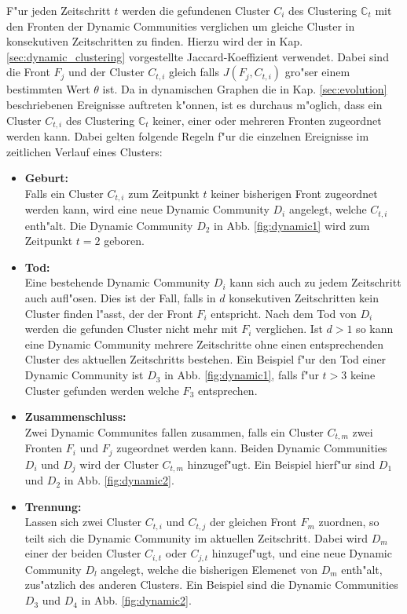 \documentclass[journal]{vgtc}
\begin{document}
    F"ur jeden Zeitschritt $t$ werden die gefundenen Cluster $C_i$ des Clustering $\mathbb{C}_t$ mit den Fronten der Dynamic Communities
    verglichen um gleiche Cluster in konsekutiven Zeitschritten zu finden. Hierzu wird der in Kap. \ref{sec:dynamic_clustering}
    vorgestellte Jaccard-Koeffizient verwendet. Dabei sind die
    Front $F_j$ und der Cluster $C_{t,i}$ gleich falls $J(F_j,C_{t,i})$ gro"ser einem bestimmten Wert $\theta$ ist. Da in dynamischen Graphen
    die in Kap. \ref{sec:evolution} beschriebenen Ereignisse auftreten k"onnen, ist es durchaus m"oglich, dass ein Cluster $C_{t,i}$ des
    Clustering $\mathbb{C}_t$ keiner, einer oder mehreren Fronten zugeordnet werden kann. Dabei gelten folgende Regeln f"ur die 
    einzelnen Ereignisse im zeitlichen Verlauf eines Clusters:
    \begin{itemize}
      \item \textbf{Geburt:} \hfill \\
	    Falls ein Cluster $C_{t,i}$ zum Zeitpunkt $t$ keiner bisherigen Front zugeordnet werden kann, wird eine neue Dynamic Community
	    $D_i$ angelegt, welche $C_{t,i}$ enth"alt. Die Dynamic Community $D_2$ in Abb. \ref{fig:dynamic1} wird zum Zeitpunkt $t=2$ geboren. 
      \item \textbf{Tod:} \hfill \\
	    Eine bestehende Dynamic Community $D_i$ kann sich auch zu jedem Zeitschritt auch aufl"osen. Dies ist der Fall, falls in $d$ konsekutiven
	    Zeitschritten kein Cluster finden l"asst, der der Front $F_i$ entspricht. Nach dem Tod von $D_i$ werden die gefunden Cluster nicht mehr mit
	    $F_i$ verglichen. Ist $d>1$ so kann eine Dynamic Community mehrere Zeitschritte ohne einen entsprechenden Cluster des aktuellen Zeitschritts bestehen.
	    Ein Beispiel f"ur den Tod einer Dynamic Community ist $D_3$ in Abb. \ref{fig:dynamic1}, falls f"ur $t>3$ keine Cluster gefunden werden welche $F_3$ entsprechen.
      \item \textbf{Zusammenschluss:} \hfill \\
	    Zwei Dynamic Communites fallen zusammen, falls ein Cluster $C_{t,m}$ zwei Fronten $F_i$ und $F_j$ zugeordnet werden kann. Beiden Dynamic Communities
	    $D_i$ und $D_j$ wird der Cluster $C_{t,m}$ hinzugef"ugt. Ein Beispiel hierf"ur sind $D_1$ und $D_2$ in Abb. \ref{fig:dynamic2}.
      \item \textbf{Trennung:} \hfill \\
	    Lassen sich zwei Cluster $C_{t,i}$ und $C_{t,j}$ der gleichen Front $F_m$ zuordnen, so teilt sich die Dynamic Community im aktuellen Zeitschritt.
	    Dabei wird $D_m$ einer der beiden Cluster $C_{i,t}$ oder $C_{j,t}$ hinzugef"ugt, und eine neue Dynamic Community $D_l$ angelegt, welche die bisherigen
	    Elemenet von $D_m$ enth"alt, zus"atzlich des anderen Clusters.
	    Ein Beispiel sind die Dynamic Communities $D_3$ und $D_4$ in Abb. \ref{fig:dynamic2}.
    \end{itemize}
\end{document}

